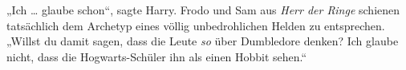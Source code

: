 „Ich … glaube schon“, sagte Harry. Frodo und Sam aus \emph{Herr der Ringe} schienen tatsächlich dem Archetyp eines völlig unbedrohlichen Helden zu entsprechen.
„Willst du damit sagen, dass die Leute \emph{so} über Dumbledore denken? Ich glaube nicht, dass die Hogwarts-Schüler ihn als einen Hobbit sehen.“

